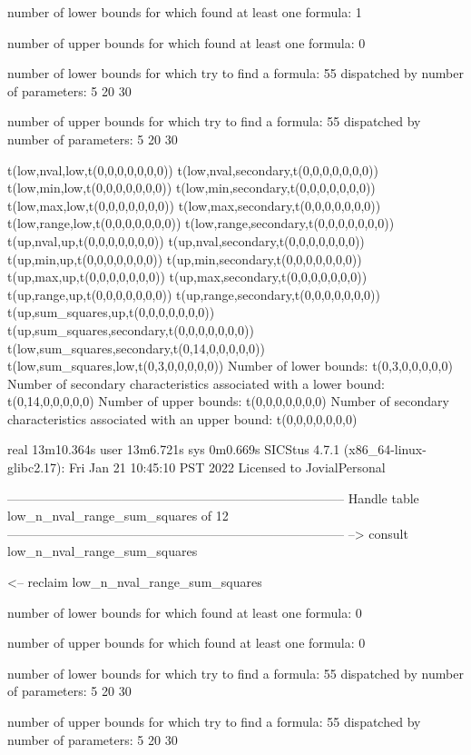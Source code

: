 number of lower bounds for which found at least one formula: 1

number of upper bounds for which found at least one formula: 0

number of lower bounds for which try to find a formula: 55
dispatched by number of parameters: 5  20  30

number of upper bounds for which try to find a formula: 55
dispatched by number of parameters: 5  20  30

t(low,nval,low,t(0,0,0,0,0,0,0))
t(low,nval,secondary,t(0,0,0,0,0,0,0))
t(low,min,low,t(0,0,0,0,0,0,0))
t(low,min,secondary,t(0,0,0,0,0,0,0))
t(low,max,low,t(0,0,0,0,0,0,0))
t(low,max,secondary,t(0,0,0,0,0,0,0))
t(low,range,low,t(0,0,0,0,0,0,0))
t(low,range,secondary,t(0,0,0,0,0,0,0))
t(up,nval,up,t(0,0,0,0,0,0,0))
t(up,nval,secondary,t(0,0,0,0,0,0,0))
t(up,min,up,t(0,0,0,0,0,0,0))
t(up,min,secondary,t(0,0,0,0,0,0,0))
t(up,max,up,t(0,0,0,0,0,0,0))
t(up,max,secondary,t(0,0,0,0,0,0,0))
t(up,range,up,t(0,0,0,0,0,0,0))
t(up,range,secondary,t(0,0,0,0,0,0,0))
t(up,sum_squares,up,t(0,0,0,0,0,0,0))
t(up,sum_squares,secondary,t(0,0,0,0,0,0,0))
t(low,sum_squares,secondary,t(0,14,0,0,0,0,0))
t(low,sum_squares,low,t(0,3,0,0,0,0,0))
Number of lower bounds:                                             t(0,3,0,0,0,0,0)
Number of secondary characteristics associated with a lower bound:  t(0,14,0,0,0,0,0)
Number of upper bounds:                                             t(0,0,0,0,0,0,0)
Number of secondary characteristics associated with an upper bound: t(0,0,0,0,0,0,0)

real	13m10.364s
user	13m6.721s
sys	0m0.669s
SICStus 4.7.1 (x86_64-linux-glibc2.17): Fri Jan 21 10:45:10 PST 2022
Licensed to JovialPersonal


--------------------------------------------------------------------------------
Handle table low_n_nval_range_sum_squares of 12
--------------------------------------------------------------------------------
--> consult low_n_nval_range_sum_squares

<-- reclaim low_n_nval_range_sum_squares

number of lower bounds for which found at least one formula: 0

number of upper bounds for which found at least one formula: 0

number of lower bounds for which try to find a formula: 55
dispatched by number of parameters: 5  20  30

number of upper bounds for which try to find a formula: 55
dispatched by number of parameters: 5  20  30

